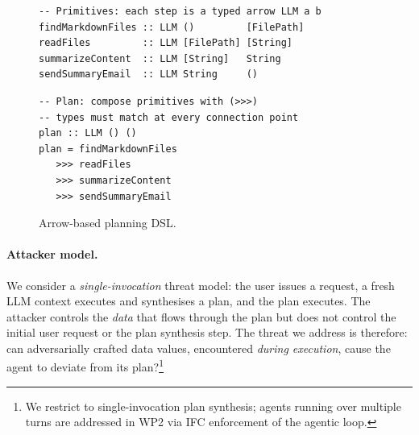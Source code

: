 \documentclass{kaw}
\begin{document}
\begin{figure}[b]
{}%
\par\smallskip
\begin{minipage}[t]{0.47\linewidth}
\begin{verbatim}
-- Primitives: each step is a typed arrow LLM a b
findMarkdownFiles :: LLM ()         [FilePath]
readFiles         :: LLM [FilePath] [String]
summarizeContent  :: LLM [String]   String
sendSummaryEmail  :: LLM String     ()
\end{verbatim}
\end{minipage}%
\hfill
\begin{minipage}[t]{0.47\linewidth}
\begin{verbatim}
-- Plan: compose primitives with (>>>)
-- types must match at every connection point
plan :: LLM () ()
plan = findMarkdownFiles
   >>> readFiles
   >>> summarizeContent
   >>> sendSummaryEmail
\end{verbatim}
\end{minipage}
\caption{Arrow-based planning DSL.\label{fig:arrows}}
\end{figure}




\paragraph{Attacker model.}
We consider a \emph{single-invocation} threat model: the user issues a
request, a fresh LLM context executes and synthesises a plan, and the plan executes.
%
The attacker controls the \emph{data} that flows through the plan 
but does not control the initial user request or the plan
synthesis step.
%
The threat we address is therefore: can adversarially crafted data values,
encountered \emph{during execution},
cause the agent to deviate from its plan?\footnote{We restrict to
single-invocation plan synthesis; agents running over multiple turns are
addressed in WP2 via IFC enforcement of the agentic loop.}
%
\end{document}
